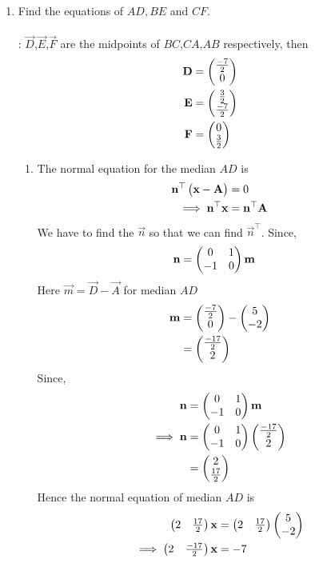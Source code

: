 \documentclass[11pt]{book}
\begin{document}
\begin{enumerate}[label=\thesection.\arabic*.,ref=\thesection.\theenumi]
\item Find the equations of $AD, BE$ and $CF$.\\
\\ \solution:
$\vec{D}$,$\vec{E}$,$\vec{F}$ are the midpoints of $BC$,$CA$,$AB$ respectively, then\\
\begin{align}
 \mathbf{D} &=  \begin{pmatrix}\frac{-7}{2}\\0\end{pmatrix}\\
 \mathbf{E} &=  \begin{pmatrix}\frac{3}{2}\\ \frac{-7}{2}\end{pmatrix}\\
 \mathbf{F} &= \begin{pmatrix}0 \\ \frac{3}{2}\end{pmatrix}
\end{align}
\begin{enumerate}

 \item The normal equation for the median $AD$ is
  \begin{align}
    \mathbf{n}^{\top}\begin{pmatrix}\mathbf{x}-\mathbf{A}\end{pmatrix}&=0\\
    \implies
    \mathbf{n}^{\top}\mathbf{x}&=\mathbf{n}^{\top}\mathbf{A}
  \end{align}
 We have to find the $\vec{n}$ so that we can find $\vec{n}^{\top}$.
 Since,
\begin{align}
  \mathbf{n} &= \begin{pmatrix}0 & 1\\
  -1 & 0\end{pmatrix}\mathbf{m}
\end{align}
Here $\vec{m} = \vec{D}- \vec{A}$ for median $AD$
\begin{align}
\mathbf{m}&=\begin{pmatrix}\frac{-7}{2}\\ 0\end{pmatrix} - \begin{pmatrix}5\\-2\end{pmatrix}\\
       &=\begin{pmatrix}\frac{-17}{2}\\2\end{pmatrix}
\end{align}
Since,
\begin{align}
  \mathbf{n} &= \begin{pmatrix}0 & 1\\
  -1 & 0\end{pmatrix}\mathbf{m}\\
\implies
\mathbf{n} &= \begin{pmatrix}0 & 1\\
  -1 & 0\end{pmatrix}\begin{pmatrix}\frac{-17}{2}\\2\end{pmatrix}\\
        &= \begin{pmatrix}2 \\\frac{17}{2}\end{pmatrix}
\end{align}
Hence the normal equation of median $AD$ is 
\begin{align}
    \begin{pmatrix}2 & \frac{17}{2}\end{pmatrix}\mathbf{x}&=\begin{pmatrix}2 & \frac{17}{2}\end{pmatrix}\begin{pmatrix}5\\-2\end{pmatrix}\\
    \implies
    \begin{pmatrix}2 & \frac{-17}{2}\end{pmatrix}\mathbf{x}&=-7
\end{align}


\end{enumerate}
\end{enumerate}
\end{document}
